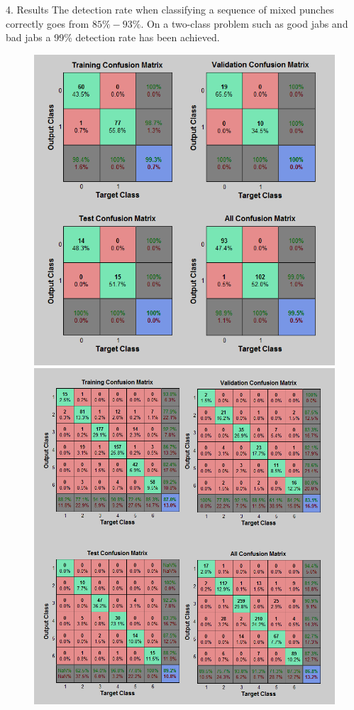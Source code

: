 \documentclass[ %
                    author={Liam O'Shea},
                supervisor={Dr. Sion Hanunna},
                     title={ZeroToHero},
                  subtitle={},
                    degree={Bsc},
                      year={2014} ]{poster}
\begin{document}
\begin{frame}{}
\begin{columns}[t]
    \begin{column}{0.422\linewidth}
    \begin{block}{\normalsize 4. Results}
    \small The detection rate when classifying a sequence of mixed punches correctly goes from $85\%-93\%$. On a two-class problem such as good jabs and bad jabs a 99\% detection rate has been achieved.
    \begin{figure}[h]
        \includegraphics[height=0.15\textheight]{images/confm2}
        \vspace{1.00mm}
        \includegraphics[height=0.15\textheight]{images/confm6}

\end{figure}
\end{block}
\end{column}
\end{columns}
\end{frame}
\end{document}
